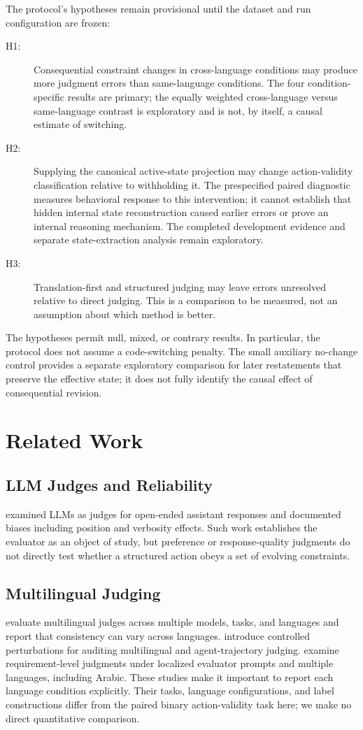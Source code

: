 \documentclass[11pt]{article}
\begin{document}
The protocol's hypotheses remain provisional until the dataset and run configuration are frozen:
\begin{description}
  \item[H1:] Consequential constraint changes in cross-language conditions may produce more judgment errors than same-language conditions. The four condition-specific results are primary; the equally weighted cross-language versus same-language contrast is exploratory and is not, by itself, a causal estimate of switching.
  \item[H2:] Supplying the canonical active-state projection may change action-validity classification relative to withholding it. The prespecified paired diagnostic measures behavioral response to this intervention; it cannot establish that hidden internal state reconstruction caused earlier errors or prove an internal reasoning mechanism. The completed development evidence and separate state-extraction analysis remain exploratory.
  \item[H3:] Translation-first and structured judging may leave errors unresolved relative to direct judging. This is a comparison to be measured, not an assumption about which method is better.
\end{description}

The hypotheses permit null, mixed, or contrary results. In particular, the protocol does not assume a code-switching penalty. The small auxiliary no-change control provides a separate exploratory comparison for later restatements that preserve the effective state; it does not fully identify the causal effect of consequential revision.

\section{Related Work}
\subsection{LLM Judges and Reliability}
\citet{zheng-etal-2023-mtbench} examined LLMs as judges for open-ended assistant responses and documented biases including position and verbosity effects. Such work establishes the evaluator as an object of study, but preference or response-quality judgments do not directly test whether a structured action obeys a set of evolving constraints.

\subsection{Multilingual Judging}
\citet{fu-liu-2025-multilingual-judge} evaluate multilingual judges across multiple models, tasks, and languages and report that consistency can vary across languages. \citet{kc-2026-babeljudge} introduce controlled perturbations for auditing multilingual and agent-trajectory judging. \citet{mahmood-etal-2026-localization} examine requirement-level judgments under localized evaluator prompts and multiple languages, including Arabic. These studies make it important to report each language condition explicitly. Their tasks, language configurations, and label constructions differ from the paired binary action-validity task here; we make no direct quantitative comparison.
\end{document}
